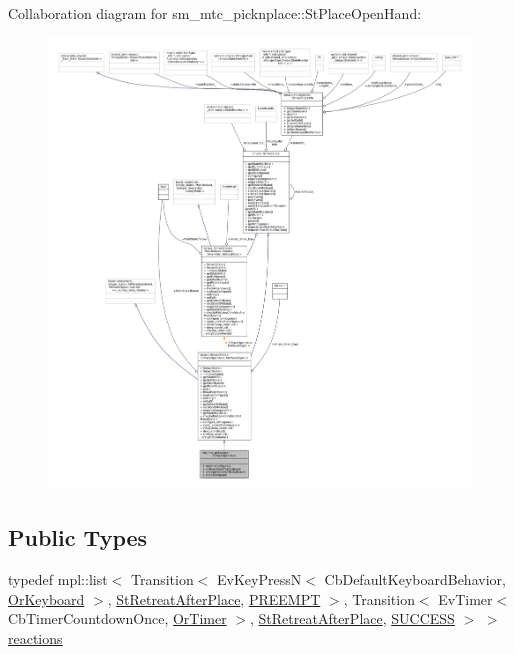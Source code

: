 Collaboration diagram for sm\+\_\+mtc\+\_\+picknplace\+:\+:St\+Place\+Open\+Hand\+:
\nopagebreak
\begin{figure}[H]
\begin{center}
\leavevmode
\includegraphics[width=350pt]{structsm__mtc__picknplace_1_1StPlaceOpenHand__coll__graph}
\end{center}
\end{figure}
\subsection*{Public Types}
\begin{DoxyCompactItemize}
\item 
typedef mpl\+::list$<$ Transition$<$ Ev\+Key\+PressN$<$ Cb\+Default\+Keyboard\+Behavior, \hyperlink{classsm__mtc__picknplace_1_1OrKeyboard}{Or\+Keyboard} $>$, \hyperlink{structsm__mtc__picknplace_1_1StRetreatAfterPlace}{St\+Retreat\+After\+Place}, \hyperlink{classPREEMPT}{P\+R\+E\+E\+M\+PT} $>$, Transition$<$ Ev\+Timer$<$ Cb\+Timer\+Countdown\+Once, \hyperlink{classsm__mtc__picknplace_1_1OrTimer}{Or\+Timer} $>$, \hyperlink{structsm__mtc__picknplace_1_1StRetreatAfterPlace}{St\+Retreat\+After\+Place}, \hyperlink{classSUCCESS}{S\+U\+C\+C\+E\+SS} $>$ $>$ \hyperlink{structsm__mtc__picknplace_1_1StPlaceOpenHand_a4b0ae9df1faa97e8f298a19ef19c3f32}{reactions}
\end{DoxyCompactItemize}
